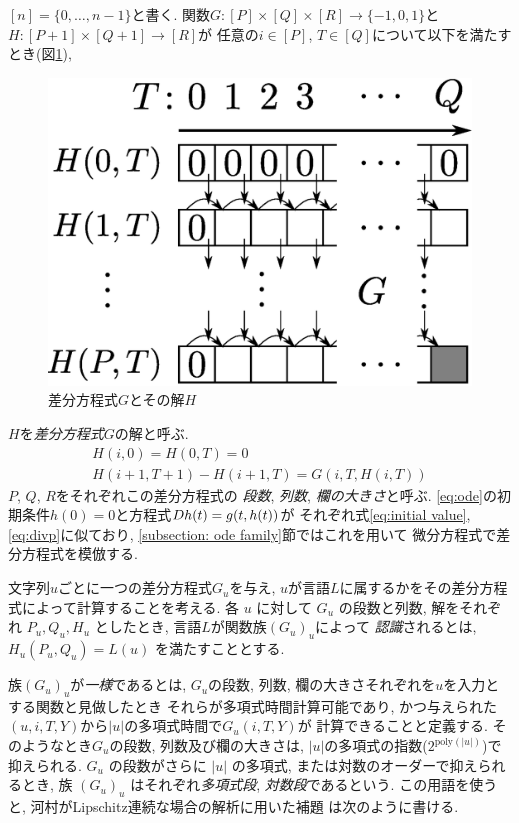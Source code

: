 $[n] = \{0, \dots , n-1\}$と書く.
関数$G \colon [P] \times [Q] \times [R] \to \{-1, 0, 1\}$と
$H \colon [P + 1] \times [Q+1] \to [R]$が
任意の$i \in [P]$, $T \in [Q]$について以下を満たすとき(図\ref{fig:divp}), 
\begin{figure}
 \begin{center}
  \includegraphics[height=0.15\textheight]{image/divp.eps}
 \end{center}
 \caption{差分方程式$G$とその解$H$}
 \label{fig:divp}
\end{figure}
$H$を\emph{差分方程式}\kern\xkanjiskip$G$の解と呼ぶ.
\begin{gather}
   H(i, 0) = H(0, T) = 0 \label{eq:initial value}
\\
   H(i + 1, T + 1) - H(i+1, T) = G(i, T, H(i, T))  \label{eq:divp}
\end{gather}
$P$, $Q$, $R$をそれぞれこの差分方程式の
\emph{段数}, \emph{列数}, \emph{欄の大きさ}と呼ぶ.
\eqref{eq:ode}の初期条件$h(0) = 0$と方程式$D h(t) = g(t, h(t))$が
それぞれ式\eqref{eq:initial value}, \eqref{eq:divp}に似ており, 
\ref{subsection: ode family}節ではこれを用いて
微分方程式で差分方程式を模倣する. 

文字列$u$ごとに一つの差分方程式$G _u$を与え,
$u$が言語$L$に属するかをその差分方程式によって計算することを考える.
各 $u$ に対して $G_u$ の段数と列数, 解をそれぞれ $P_u, Q_u, H_u$ としたとき,
言語$L$が関数族$(G_u)_u$によって
\emph{認識}されるとは,
$H_u(P_u, Q_u) = L(u)$ を満たすこととする.

族$(G_u)_u$が\emph{一様}であるとは,
$G_u$の段数, 列数, 欄の大きさそれぞれを$u$を入力とする関数と見做したとき
それらが多項式時間計算可能であり,
かつ与えられた$(u, i, T, Y)$から$|u|$の多項式時間で$G_u(i, T, Y)$が
計算できることと定義する.
そのようなとき$G _u$の段数, 列数及び欄の大きさは,
$|u|$の多項式の指数($2^{\mathrm{poly} (|u|)}$)で抑えられる.
$G_u$ の段数がさらに $|u|$ の多項式, または対数のオーダーで抑えられるとき, 
族 $(G_u) _u$ はそれぞれ\emph{多項式段}, \emph{対数段}であるという. 
この用語を使うと, 
河村がLipschitz連続な場合の解析に用いた補題
\cite[補題4.7]{kawamura2010lipschitz}は次のように書ける. 

